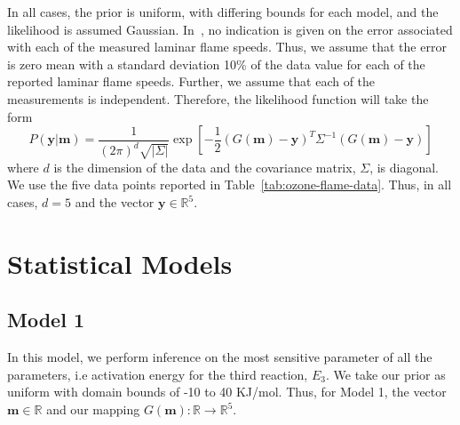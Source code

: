  In all cases,
the prior is uniform, with differing bounds for each model, and the
likelihood is assumed Gaussian. In~\cite{Streng}, no indication is
given on the error associated with each of the measured laminar flame
speeds. Thus, we assume that the error is zero mean with a standard
deviation 10\% of the data value for each of the reported laminar
flame speeds. Further, we assume that each of the measurements is
independent. Therefore, the likelihood function will take the form
%
\begin{equation}
P(\mathbf{y}|\mathbf{m}) = \frac{1}{(2\pi)^d \sqrt{|\Sigma|}}
\exp\left[ -\frac{1}{2}\left(G(\mathbf{m}) -
  \mathbf{y}\right)^T\Sigma^{-1} \left(G(\mathbf{m}) -
  \mathbf{y}\right) \right]
\end{equation}
%
where $d$ is the dimension of the data and the covariance matrix, $\Sigma$, is diagonal.
We use the five data points reported in Table~\ref{tab:ozone-flame-data}.
Thus, in all cases, $d = 5$ and the vector $\mathbf{y} \in \mathbb{R}^5$.

 


\section{Statistical Models}

\subsection{Model 1}
 In this model, we perform inference on the most
 sensitive parameter of all the parameters, i.e activation energy for
 the third reaction, $E_3$. We take our prior as uniform with domain
 bounds of -10 to 40 KJ/mol. Thus, for Model 1, the vector
 $\mathbf{m} \in \mathbb{R}$ and our mapping $G(\mathbf{m}):
 \mathbb{R} \rightarrow \mathbb{R}^5$.


